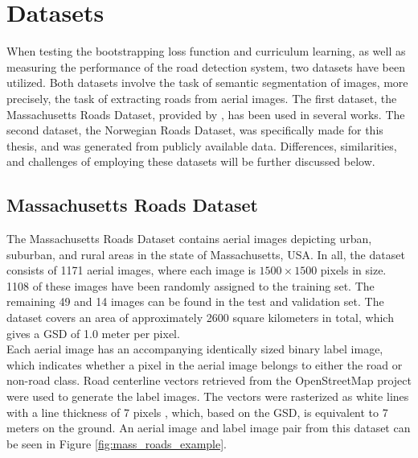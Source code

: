 \section{Datasets}
\label{sec:datasets}
  When testing the bootstrapping loss function and curriculum learning, as well as measuring the performance of the road detection system, two datasets have been utilized. Both datasets involve the task of semantic segmentation of images, more precisely, the task of extracting roads from aerial images. The first dataset, the Massachusetts Roads Dataset, provided by \cite{MnihThesis}, has been used in several works. The second dataset, the Norwegian Roads Dataset, was specifically made for this thesis, and was generated from publicly available data. Differences, similarities, and challenges of employing these datasets will be further discussed below.\\

\subsection{Massachusetts Roads Dataset}
The Massachusetts Roads Dataset contains aerial images depicting urban, suburban, and rural areas in the state of Massachusetts, USA. In all, the dataset consists of 1171 aerial images, where each image is $1500\times 1500$ pixels in size. 1108 of these images have been randomly assigned to the training set. The remaining 49 and 14 images can be found in the test and validation set. The dataset covers an area of approximately 2600 square kilometers in total, which gives a \ac{GSD} of 1.0 meter per pixel.\\

Each aerial image has an accompanying identically sized binary label image, which indicates whether a pixel in the aerial image belongs to either the road or non-road class. Road centerline vectors retrieved from the OpenStreetMap project were used to generate the label images. The vectors were rasterized as white lines with a line thickness of 7 pixels \citep{MnihThesis}, which, based on the \ac{GSD}, is equivalent to 7 meters on the ground. An aerial image and label image pair from this dataset can be seen in Figure \ref{fig:mass_roads_example}.\\

